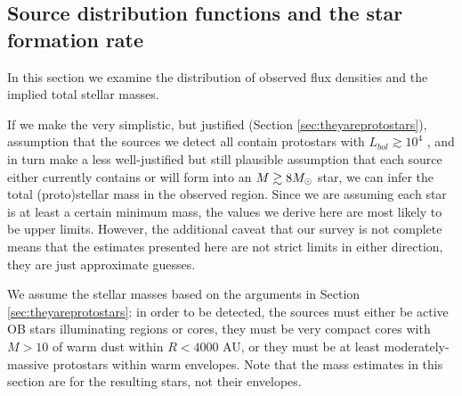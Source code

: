 \documentclass[twocolumn]{aastex61}
\begin{document}
\subsection{Source distribution functions and the star formation rate}
\label{sec:distributionsandsfr}

In this section we examine the distribution of observed flux densities and the
implied total stellar masses.  


If we make the very simplistic, but justified (Section
\ref{sec:theyareprotostars}), assumption that the sources we
detect all contain protostars with $L_{bol}\gtrsim10^4$ \lsun, and in turn make
a less well-justified but still plausible assumption that each source either
currently contains or will form into an $M\gtrsim8 M_{\odot}$ star, we can infer
the total (proto)stellar mass in the observed region.  Since we are assuming
each star is at least a certain minimum mass, the values we derive here are
most likely to be upper limits.  However, the additional caveat
that our survey is not complete means that the estimates presented here are not
strict limits in either direction, they are just approximate guesses.

We assume the
stellar masses based on the arguments in Section \ref{sec:theyareprotostars}:
in order to be detected, the sources must either be active OB stars
illuminating \hii regions or cores, they must be very compact cores with
$M>10$ \msun of warm dust within $R<4000$ AU, or they must be
at least moderately-massive protostars within warm envelopes.  Note that the
mass estimates in this section are for the resulting stars, not their
envelopes.

\end{document}
